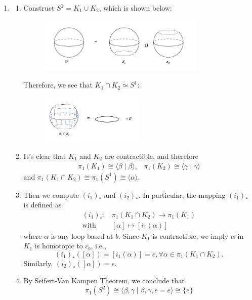 \begin{example}
\begin{enumerate}
\item
\begin{enumerate}
\item
Construct $S^2=K_1\cup K_2$, which is shown below:
\begin{figure}[H]
\centering
\includegraphics[width=0.8\textwidth]{week15/f_46}
\end{figure}
Therefore, we see that $K_1\cap K_2\simeq S^1$:
\begin{figure}[H]
\centering
\includegraphics[width=0.5\textwidth]{week15/f_47}
\end{figure}
\item
It's clear that $K_1$ and $K_2$ are contractible, and therefore
\[
\begin{array}{ll}
\pi_1(K_1)\cong\langle\beta\mid\beta\rangle,
&
\pi_1(K_2)\cong\langle\gamma\mid\gamma\rangle
\end{array}
\]
and $\pi_1(K_1\cap K_2)\cong\pi_1(S^1)\cong\langle\alpha\rangle$.
\item
Then we compute $(i_1)_*$ and $(i_2)_*$.
In particular, the mapping $(i_1)_*$ is defined as
\[
\begin{array}{ll}
(i_1)_*:&\pi_1(K_1\cap K_2)\to \pi_1(K_1)\\
\text{with}&[\alpha]\mapsto[i_1(\alpha)]
\end{array}
\]
where $\alpha$ is any loop based at $b$. Since $K_1$ is contractible, we imply $\alpha$ in $K_1$ is homotopic to $c_b$, i.e., 
\[
(i_1)_*([\alpha]) = [i_1(\alpha)]=e,\forall \alpha\in \pi_1(K_1\cap K_2).
\]
Similarly, $(i_2)_*([\alpha])=e$.
\item
By Seifert-Van Kampen Theorem, we conclude that
\[
\pi_1(S^2) \cong \langle
\beta,\gamma\mid \beta,\gamma,e=e
\rangle
\cong
\{e\}
\]
\end{enumerate}


\end{enumerate}
\end{example}
